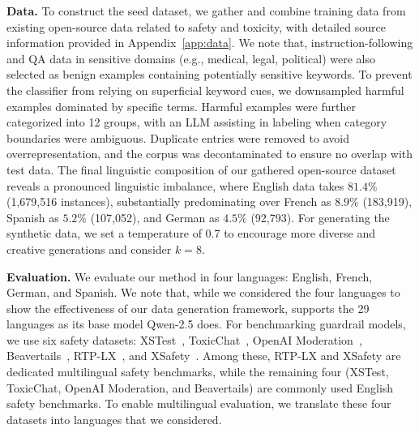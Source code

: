 \textbf{Data.} To construct the seed dataset, we gather and combine training data from existing open-source data related to safety and toxicity, with detailed source information provided in Appendix~\ref{app:data}. We note that, instruction-following and QA data in sensitive domains (e.g., medical, legal, political) were also selected as benign examples containing potentially sensitive keywords. To prevent the classifier from relying on superficial keyword cues, we downsampled harmful examples dominated by specific terms. Harmful examples were further categorized into 12 groups, with an LLM assisting in labeling when category boundaries were ambiguous. Duplicate entries were removed to avoid overrepresentation, and the corpus was decontaminated to ensure no overlap with test data. 
The final linguistic composition of our gathered open-source dataset reveals a pronounced linguistic imbalance, where English data takes $81.4\%$ (1,679,516 instances), substantially predominating over French as $8.9\%$ (183,919), Spanish as $5.2\%$ (107,052), and German as $4.5\%$ (92,793). For generating the synthetic data, we set a temperature of 0.7 to encourage more diverse and creative generations and consider $k=8$.

\textbf{Evaluation.} We evaluate our method in four languages: English, French, German, and Spanish. We note that, while we considered the four languages to show the effectiveness of our data generation framework, \ours supports the 29 languages as its base model Qwen-2.5 does. 
For benchmarking guardrail models, we use six safety datasets: XSTest~\citep{rottger2023xstest}, ToxicChat~\citep{lin2023toxicchat}, OpenAI Moderation~\citep{markov2023holistic}, Beavertails~\citep{ji2024beavertails}, RTP-LX~\citep{de2024rtp}, and XSafety~\citep{wang2023all}. Among these, RTP-LX and XSafety are dedicated multilingual safety benchmarks, while the remaining four (XSTest, ToxicChat, OpenAI Moderation, and Beavertails) are commonly used English safety benchmarks. To enable multilingual evaluation, we translate these four datasets into languages that we considered.


